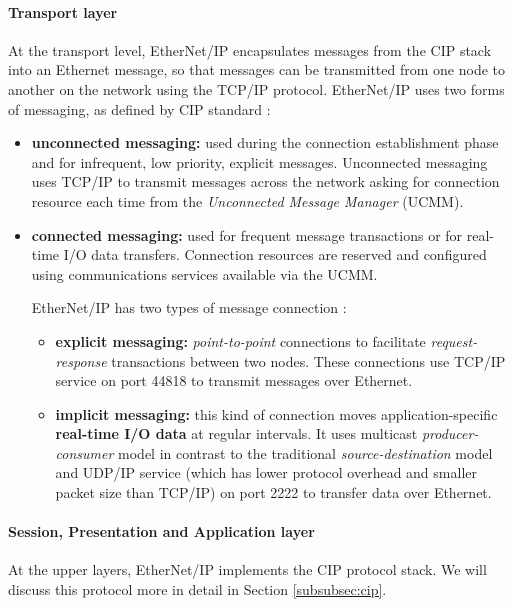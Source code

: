 \bigskip
\paragraph{Transport layer} 

At the transport level, EtherNet/IP encapsulates messages from the CIP stack into an Ethernet message, so that messages can be transmitted from one node to another on the network using the TCP/IP protocol. EtherNet/IP uses two forms of messaging, as
defined by CIP standard \cite{enip_pdf}\cite{enip_pdf2}:

\begin{itemize}
	\item \textbf{unconnected messaging:} used during the connection establishment phase and for infrequent, low priority, explicit messages. Unconnected messaging uses TCP/IP to transmit messages across the network asking for connection resource each time from the \textit{Unconnected Message Manager} (UCMM).
	
	\item \textbf{connected messaging:} used for frequent message transactions or for real-time I/O data transfers. Connection resources are reserved and configured using communications services available via the UCMM.
	
	\bigskip
	EtherNet/IP has two types of message connection \cite{enip_pdf}:
	\begin{itemize}
		\item \textbf{explicit messaging:} \textit{point-to-point} connections to facilitate \textit{request-response} transactions between two nodes. These connections use TCP/IP service on port 44818 to transmit messages over Ethernet.
		
		\item \textbf{implicit messaging:} this kind of connection moves application-specific \textbf{real-time I/O data} at regular intervals. It uses multicast \textit{producer-consumer} model in contrast to the traditional \textit{source-destination} model and UDP/IP service (which has lower protocol overhead and smaller packet size than TCP/IP) on port 2222 to transfer data over Ethernet. 
	\end{itemize}
\end{itemize}

\paragraph{Session, Presentation and Application layer} At the upper layers, EtherNet/IP implements the CIP protocol stack. We will discuss this protocol more in detail in Section \ref{subsubsec:cip}. 


